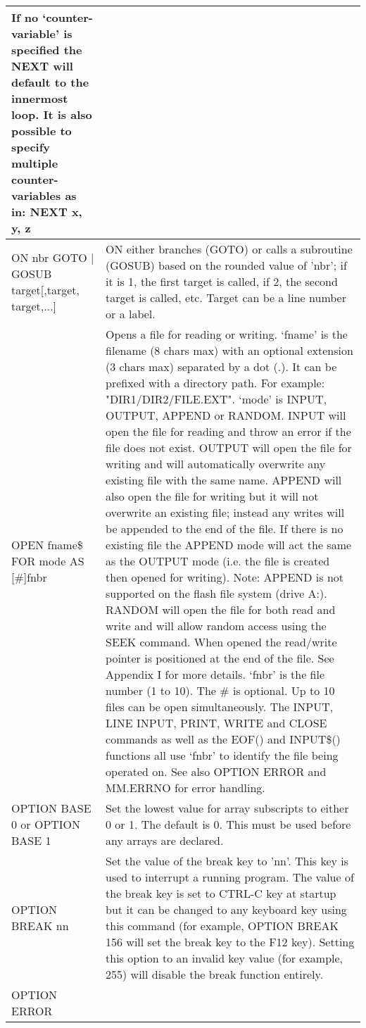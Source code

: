 \documentclass[11pt,fleqn]{book} %
\numberwithin{equation}{section} %
\numberwithin{figure}{section} %
\numberwithin{table}{section} %
\begin{document}
\begin{table}[]
\begin{tabular}{|p{4cm}|p{10cm}|}
If no ‘counter-variable’ is specified the NEXT will default to the
innermost loop. It is also possible to specify multiple counter-variables
as in:
NEXT x, y, z
\\ \hline
ON nbr GOTO | GOSUB
target[,target, target,...]
& ON either branches (GOTO) or calls a subroutine (GOSUB) based on
the rounded value of 'nbr'; if it is 1, the first target is called, if 2, the
second target is called, etc. Target can be a line number or a label.
\\ \hline
OPEN fname\$ FOR mode
AS [\#]fnbr
& Opens a file for reading or writing.
‘fname’ is the filename (8 chars max) with an optional extension (3 chars
max) separated by a dot (.). It can be prefixed with a directory path. For
example: "DIR1/DIR2/FILE.EXT".
‘mode’ is INPUT, OUTPUT, APPEND or RANDOM.
INPUT will open the file for reading and throw an error if the file does
not exist. OUTPUT will open the file for writing and will automatically
overwrite any existing file with the same name.
APPEND will also open the file for writing but it will not overwrite an
existing file; instead any writes will be appended to the end of the file. If
there is no existing file the APPEND mode will act the same as the
OUTPUT mode (i.e. the file is created then opened for writing). Note:
APPEND is not supported on the flash file system (drive A:).
RANDOM will open the file for both read and write and will allow
random access using the SEEK command. When opened the read/write
pointer is positioned at the end of the file. See Appendix I for more
details.
‘fnbr’ is the file number (1 to 10). The \# is optional. Up to 10 files can
be open simultaneously. The INPUT, LINE INPUT, PRINT, WRITE
and CLOSE commands as well as the EOF() and INPUT\$() functions all
use ‘fnbr’ to identify the file being operated on.
See also OPTION ERROR and MM.ERRNO for error handling.
\\ \hline
OPTION BASE 0
or
OPTION BASE 1
& Set the lowest value for array subscripts to either 0 or 1. The default is
0.
This must be used before any arrays are declared.
\\ \hline
OPTION BREAK nn
& Set the value of the break key to 'nn'. This key is used to interrupt a
running program.
The value of the break key is set to CTRL-C key at startup but it can be
changed to any keyboard key using this command (for example,
OPTION BREAK 156 will set the break key to the F12 key).
Setting this option to an invalid key value (for example, 255) will disable
the break function entirely.
\\ \hline
OPTION ERROR

\end{tabular}
\end{table}
\end{document}
